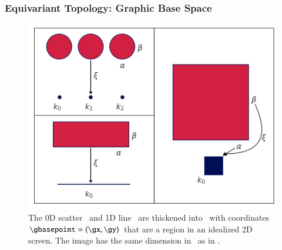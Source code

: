 \documentclass[journal]{vgtc}                %
\begin{document}
\subsubsection{Equivariant Topology: Graphic Base Space}
\label{sec:math:graphic:base}
\begin{figure}[htb]
  \centering %
  \includegraphics[width=\columnwidth]{retraction_maps.png}
  \caption{The 0D scatter \dbasepoint\ and 1D line \dbasepoint\ are thickened into \gbase\ with coordinates $\gbasepoint=(\gx, \gy)$ that are a region in an idealized 2D screen. The image has the same dimension in \gbase\ as in \dbase.}
  \label{fig:math:graphic:base}
 \end{figure}
\end{document}
